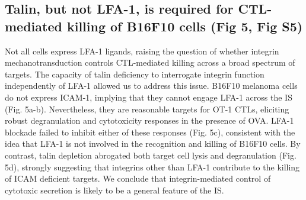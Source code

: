 \subsection{Talin, but not LFA-1, is required for CTL-mediated killing of B16F10 cells (Fig 5, Fig S5)}
Not all cells express LFA-1 ligands, raising the question of whether integrin mechanotransduction controls CTL-mediated killing across a broad spectrum of targets. The capacity of talin deficiency to interrogate integrin function independently of LFA-1 allowed us to address this issue. B16F10 melanoma cells do not express ICAM-1, implying that they cannot engage LFA-1 across the IS (Fig. 5a-b). Nevertheless, they are reasonable targets for OT-1 CTLs, eliciting robust degranulation and cytotoxicity responses in the presence of OVA. LFA-1 blockade failed to inhibit either of these responses (Fig. 5c), consistent with the idea that LFA-1 is not involved in the recognition and killing of B16F10 cells. By contrast, talin depletion abrogated both target cell lysis and degranulation (Fig. 5d), strongly suggesting that integrins other than LFA-1 contribute to the killing of ICAM deficient targets. We conclude that integrin-mediated control of cytotoxic secretion is likely to be a general feature of the IS.

